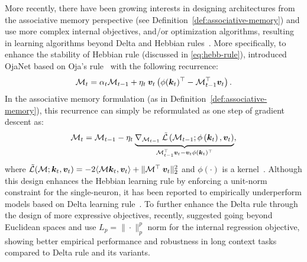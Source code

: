{
More recently, there have been growing interests in designing architectures from the associative memory perspective (see Definition~\ref{def:associative-memory}) and use more complex internal objectives, and/or optimization algorithms, resulting in learning algorithms beyond Delta and Hebbian rules~\citep{behrouz2025Miras, irie2022neural, behrouz2025atlas, von2023uncovering, zhang2025higher}. More specifically, to enhance the stability of Hebbian rule (discussed in \autoref{eq:hebb-rule}), \citet{irie2022neural} introduced OjaNet based on Oja's rule~\citep{oja1982simplified} with the following recurrence:
\begin{align}
    \mathcal{M}_t = \alpha_t \mathcal{M}_{t-1} + \eta_t \: \boldsymbol{v}_t  \left(\phi(\boldsymbol{k}_t)^{\top}  - \mathcal{M}_{t-1}^{\top} \boldsymbol{v}_t \right).
\end{align}
In the associative memory formulation (as in Definition~\ref{def:associative-memory}), this recurrence can simply be reformulated as one step of gradient descent as:
\begin{align}
    \mathcal{M}_t = \mathcal{M}_{t-1} - \eta_t \: \underset{\mathcal{M}_{t-1}^{\top} \boldsymbol{v}_t - \boldsymbol{v}_t \phi(\boldsymbol{k}_t)^{\top}}{\underbrace{\nabla_{\mathcal{M}_{t-1}} \: \tilde{\mathcal{L}}\left( \mathcal{M}_{t-1}; \phi\left(\boldsymbol{k}_t\right), \boldsymbol{v}_t \right)}},
\end{align}
where $\tilde{\mathcal{L}}(\mathcal{M}; \boldsymbol{k}_t, \boldsymbol{v}_t) = -2 \langle \mathcal{M} \boldsymbol{k}_t, \boldsymbol{v}_t \rangle + \|\mathcal{M}^{\top} \: \boldsymbol{v}_t\|^2_2$ and $\phi(\cdot)$ is a kernel~\citep{irie2022neural, irie2025fast}. Although this design enhances the Hebbian learning rule by enforcing a unit-norm constraint for the single-neuron, it has been reported to empirically underperform models based on Delta learning rule~\citep{irie2022neural}. To further enhance the Delta rule through the design of more expressive objectives, recently, \citet{behrouz2025Miras} suggested going beyond Euclidean spaces and use $L_p = \|\cdot\|_p^{p}$ norm for the internal regression objective, showing better empirical performance and robustness in long context tasks compared to Delta rule and its variants. 


}

